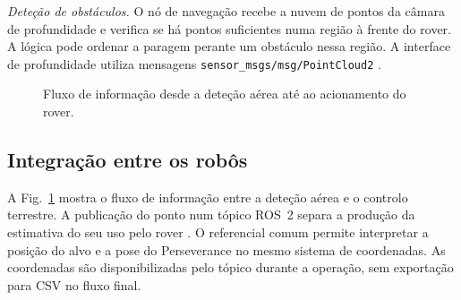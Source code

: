 \documentclass[conference]{IEEEtran}
\begin{document}
\textit{Deteção de obstáculos.}
O nó de navegação recebe a nuvem de pontos da câmara de profundidade e verifica se há pontos suficientes numa região à frente do rover. A lógica pode ordenar a paragem perante um obstáculo nessa região. A interface de profundidade utiliza mensagens \texttt{sensor\_msgs/msg/PointCloud2} \cite{pointcloud}.

\begin{figure}[!t]
\centering
{}
\caption{Fluxo de informação desde a deteção aérea até ao acionamento do rover.}
\label{fig:fluxo}
\end{figure}

\subsection{Integração entre os robôs}

A Fig.~\ref{fig:fluxo} mostra o fluxo de informação entre a deteção aérea e o controlo terrestre. A publicação do ponto num tópico ROS~2 separa a produção da estimativa do seu uso pelo rover \cite{ros-topics}. O referencial comum permite interpretar a posição do alvo e a pose do Perseverance no mesmo sistema de coordenadas. As coordenadas são disponibilizadas pelo tópico durante a operação, sem exportação para CSV no fluxo final.
\end{document}
